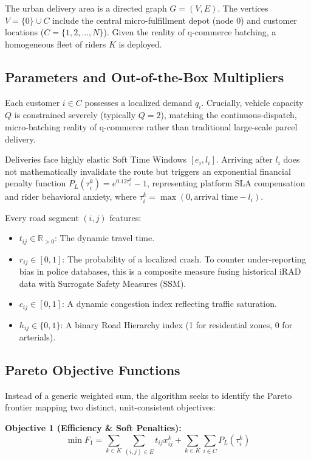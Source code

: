 \documentclass[10pt,twocolumn,letterpaper]{article}
\begin{document}
The urban delivery area is a directed graph $G = (V, E)$. The vertices $V = \{0\} \cup C$ include the central micro-fulfillment depot (node $0$) and customer locations ($C = \{1, 2, \dots, N\}$). Given the reality of q-commerce batching, a homogeneous fleet of riders $K$ is deployed.

\subsection{Parameters and Out-of-the-Box Multipliers}

Each customer $i \in C$ possesses a localized demand $q_i$. Crucially, vehicle capacity $Q$ is constrained severely (typically $Q=2$), matching the continuous-dispatch, micro-batching reality of q-commerce rather than traditional large-scale parcel delivery. 

Deliveries face highly elastic Soft Time Windows $[e_i, l_i]$. Arriving after $l_i$ does not mathematically invalidate the route but triggers an exponential financial penalty function $P_L(\tau_i^k) = e^{0.12 \tau_i^k} - 1$, representing platform SLA compensation and rider behavioral anxiety, where $\tau_i^k = \max(0, \text{arrival time} - l_i)$.

Every road segment $(i,j)$ features:
\begin{itemize}
    \item $t_{ij} \in \mathbb{R}_{>0}$: The dynamic travel time.
    \item $r_{ij} \in [0,1]$: The probability of a localized crash. To counter under-reporting bias in police databases, this is a composite measure fusing historical iRAD data with Surrogate Safety Measures (SSM).
    \item $c_{ij} \in [0,1]$: A dynamic congestion index reflecting traffic saturation.
    \item $h_{ij} \in \{0, 1\}$: A binary Road Hierarchy index (1 for residential zones, 0 for arterials).
\end{itemize}

\subsection{Pareto Objective Functions}

Instead of a generic weighted sum, the algorithm seeks to identify the Pareto frontier mapping two distinct, unit-consistent objectives:

\textbf{Objective 1 (Efficiency \& Soft Penalties):}
\begin{equation}
\min F_1 = \sum_{k \in K} \sum_{(i,j) \in E} t_{ij} x_{ij}^k + \sum_{k \in K} \sum_{i \in C} P_L(\tau_i^k)
\end{equation}
\end{document}
